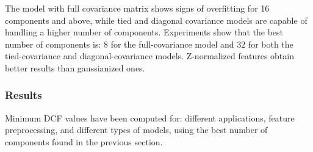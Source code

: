 \documentclass[12pt,a4paper]{article}
\begin{document}
The model with full covariance matrix shows signs of overfitting for 16 components and above, while tied and diagonal covariance models are capable of handling a higher number of components.
Experiments show that the best number of components is: 8 for the full-covariance model and 32 for both the tied-covariance and diagonal-covariance models.
Z-normalized features obtain better results than gaussianized ones.

\subsubsection{Results}

Minimum DCF values have been computed for: different applications, feature preprocessing, and different types of models, using the best number of components found in the previous section.
\end{document}
